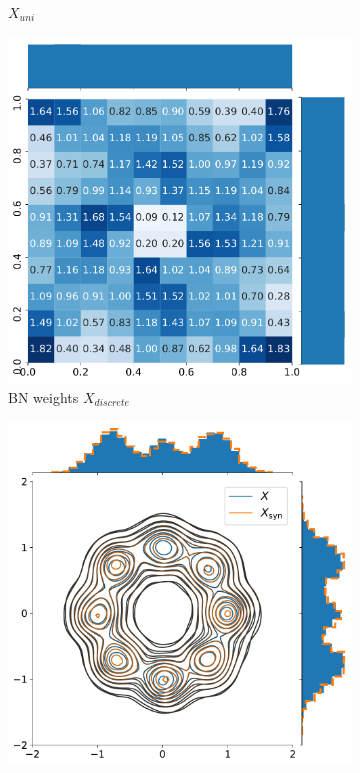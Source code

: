 \begin{figure}[htp]
\begin{subfigure}{0.3\textwidth}
\caption{$X_{uni}$}
\end{subfigure}
\begin{subfigure}{0.3\textwidth}
\centering
    \includegraphics[width=\textwidth]{../Plots/Transformations/ring_discrete_uniform_bn_weights_annotated.pdf}\quad
\caption{BN weights $X_{discrete}$}
\end{subfigure}
\begin{subfigure}{0.3\textwidth}
\centering
    \includegraphics[width=\textwidth]{../Plots/Transformations/ring_joint_marginal_with_sample_contours.pdf}

\end{subfigure}
\end{figure}
